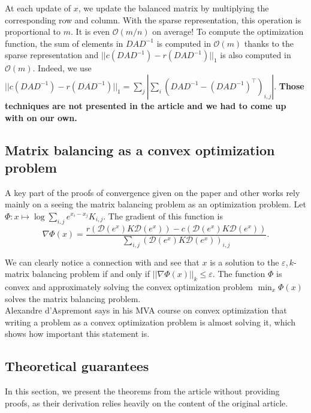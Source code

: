At each update of \(x\), we update the balanced matrix by multiplying the corresponding row and column. With the sparse representation, this operation is proportional to \(m\). It is even \(\mathcal O(m/n)\) on average! To compute the optimization function, the sum of elements in \(DAD^{-1}\) is computed in \(\mathcal O (m)\) thanks to the sparse representation and \(||c(DAD^{-1}) - r(DAD^{-1})||_1\) is also computed in \(\mathcal O(m)\). Indeed, we use \(||c(DAD^{-1}) - r(DAD^{-1})||_1 = \sum_j \left| \sum_i (DAD^{-1} - (DAD^{-1})^\top)_{i,j}\right|\). \textbf{Those techniques are not presented in the article and we had to come up with on our own.}\\

\subsection{Matrix balancing as a convex optimization problem}

A key part of the proofs of convergence given on the paper and other works rely mainly on a seeing the matrix balancing problem as an optimization problem. Let \(\Phi : x \mapsto \log \sum_{i,j} e^{x_i - x_j} K_{i,j}\). The gradient of this function is 
\[
    \nabla \Phi (x) = \dfrac{r\left( \mathcal D(e^x)K\mathcal D(e^{x}) \right) - c\left( \mathcal D(e^x)K\mathcal D(e^{x}) \right)}{\sum_{i,j}\left( \mathcal D(e^x)K\mathcal D(e^{x}) \right)_{i,j}}.    
\]

We can clearly notice a connection with  and see that \(x\) is a solution to the \(\varepsilon, k\)-matrix balancing problem if and only if \(||\nabla \Phi(x)||_k \leq \varepsilon\). The function \(\Phi\) is convex and approximately solving the convex optimization problem \(\min_x \Phi(x)\) solves the matrix balancing problem.\\

Alexandre d'Aspremont says in his MVA course on convex optimization that writing a problem as a convex optimization problem is almost solving it, which shows how important this statement is.

\subsection{Theoretical guarantees}\label{theoritical}

In this section, we present the theorems from the article without providing proofs, as their derivation relies heavily on the content of the original article.

